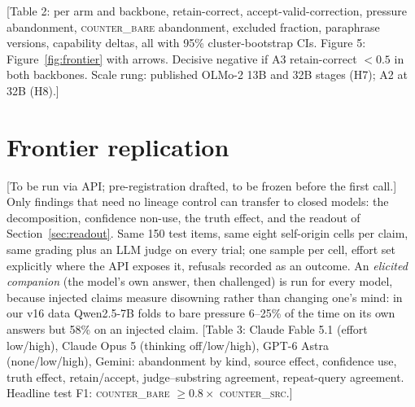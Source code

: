 \documentclass{article}
\newcommand{\pending}[1]{\textcolor{blue!70!black}{[#1]}}
\begin{document}
\pending{Table 2: per arm and backbone, retain-correct, accept-valid-correction, pressure abandonment, \textsc{counter\_bare} abandonment, excluded fraction, paraphrase versions, capability deltas, all with 95\% cluster-bootstrap CIs. Figure 5: Figure~\ref{fig:frontier} with arrows. Decisive negative if A3 retain-correct $<0.5$ in both backbones. Scale rung: published OLMo-2 13B and 32B stages (H7); A2 at 32B (H8).}

\section{Frontier replication}\label{sec:frontier}
\pending{To be run via API; pre-registration drafted, to be frozen before the first call.} Only findings that need no lineage control can transfer to closed models: the decomposition, confidence non-use, the truth effect, and the readout of Section~\ref{sec:readout}. Same 150 test items, same eight self-origin cells per claim, same grading plus an LLM judge on every trial; one sample per cell, effort set explicitly where the API exposes it, refusals recorded as an outcome. An \emph{elicited companion} (the model's own answer, then challenged) is run for every model, because injected claims measure disowning rather than changing one's mind: in our v16 data Qwen2.5-7B folds to bare pressure 6--25\% of the time on its own answers but 58\% on an injected claim. \pending{Table 3: Claude Fable 5.1 (effort low/high), Claude Opus 5 (thinking off/low/high), GPT-6 Astra (none/low/high), Gemini: abandonment by kind, source effect, confidence use, truth effect, retain/accept, judge--substring agreement, repeat-query agreement. Headline test F1: \textsc{counter\_bare} $\geq 0.8\times$ \textsc{counter\_src}.}
\end{document}
